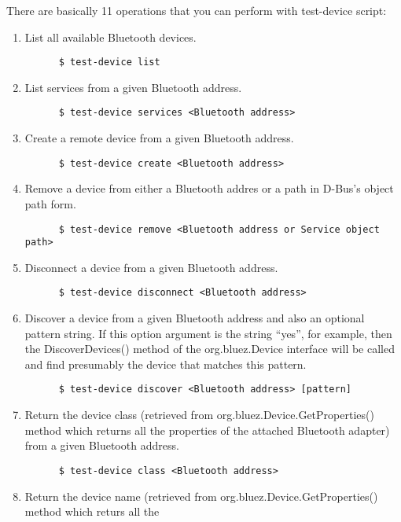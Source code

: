 \documentclass[11pt]{article}
\begin{document}
There are basically 11 operations that you can perform with test-device script:
\begin{enumerate}
  \item List all available Bluetooth devices.
    \begin{verbatim}
      $ test-device list
    \end{verbatim}
  \item List services from a given Bluetooth address.
    \begin{verbatim}
      $ test-device services <Bluetooth address>
    \end{verbatim}
  \item Create a remote device from a given Bluetooth address.
    \begin{verbatim}
      $ test-device create <Bluetooth address>
    \end{verbatim}
  \item Remove a device from either a Bluetooth addres or a path in
        D-Bus's object path form.
    \begin{verbatim}
      $ test-device remove <Bluetooth address or Service object path>
    \end{verbatim}
  \item Disconnect a device from a given Bluetooth address.
    \begin{verbatim}
      $ test-device disconnect <Bluetooth address>
    \end{verbatim}
  \item Discover a device from a given Bluetooth address and also an
        optional pattern string. If this option argument is the string
        ``yes'', for example, then the DiscoverDevices() method of the
        org.bluez.Device interface will be called and find presumably
        the device that matches this pattern.
    \begin{verbatim}
      $ test-device discover <Bluetooth address> [pattern]
    \end{verbatim}
  \item Return the device class (retrieved from
        org.bluez.Device.GetProperties() method which returns all the
        properties of the attached Bluetooth adapter) from a given
        Bluetooth address.
    \begin{verbatim}
      $ test-device class <Bluetooth address>
    \end{verbatim}
  \item Return the device name (retrieved from
        org.bluez.Device.GetProperties() method which returs all the

\end{enumerate}
\end{document}
